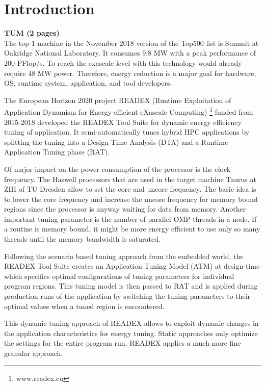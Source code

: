 \documentclass[runningheads]{llncs}
\begin{document}
\section{Introduction} \label{sec:introduction}
\textbf{TUM (2 pages)} \\ 

The top 1 machine in the November 2018 version of the Top500 list is Summit at Oakridge National Laboratory. It consumes 9.8 MW with a peak performance of 200 PFlop/s. To reach the exascale level with this technology would already require 48 MW power. Therefore, energy reduction is a major goal for hardware, OS, runtime system, application, and tool developers. 

The European Horizon 2020 project READEX (Runtime Exploitation of Application Dynamism for Energy-efficient eXascale Computing) \footnote{www.readex.eu} funded from 2015-2018 developed the READEX Tool Suite for dynamic energy efficiency tuning of application. It semi-automatically tunes hybrid HPC applications by splitting the tuning into a Design-Time Analysis (DTA) and a Runtime Application Tuning phase (RAT). 

Of major impact on the power consumption of the processor is the clock frequency. The Haswell processors  that are used in the target machine Taurus at ZIH of TU Dresden allow to set the core and  uncore frequency. The basic idea is to lower the core frequency and increase the uncore frequency for memory bound regions since the processor is anyway waiting for data from memory.  Another important tuning parameter is the number of parallel OMP threads in a node. If a routine is memory bound, it might be more energy efficient to use only so many threads until the memory bandwidth is saturated. 

Following the scenario based tuning approach \cite{filippopoulos2013exploration} from the embedded world, the READEX Tool Suite creates an Application Tuning Model (ATM) at design-time which specifies optimal configurations of tuning parameters for individual program regions. This tuning model is then passed to RAT and is applied during production runs of the application by switching the tuning parameters to their optimal values when a tuned region is encountered. 

This dynamic tuning approach of READEX allows to exploit dynamic changes in the application characteristics for energy tuning. Static approaches  only optimize the settings for the entire program run. READEX applies a much more fine granular approach. 
\end{document}

